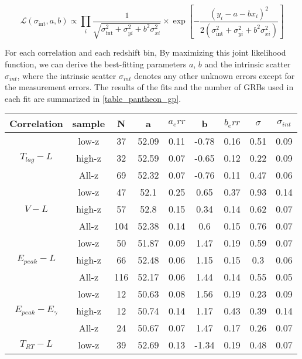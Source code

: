 $$
\mathcal{L}\left(\sigma_{\mathrm{int}}, a, b\right) \propto \prod_{i} \frac{1}{\sqrt{\sigma_{\mathrm{int}}^{2}+\sigma_{y i}^{2}+b^{2} \sigma_{x i}^{2}}} \times \exp \left[-\frac{\left(y_{i}-a-b x_{i}\right)^{2}}{2\left(\sigma_{\mathrm{int}}^{2}+\sigma_{y i}^{2}+b^{2} \sigma_{x i}^{2}\right)}\right]
$$


For each correlation and each redshift bin, By maximizing this joint likelihood function, we can derive the best-fitting parameters $a$, $b$ and the intrinsic scatter $\sigma_{int}$, where the intrinsic scatter $\sigma_{int}$ denotes any other unknown errors except for the measurement errors. The results of the fits and the number of GRBs used in each fit are summarized in \eqref{table_pantheon_gp}.




\begin{table}
\centering
\begin{tabular}{|c|c|c|c|c|c|c|c|c|}
\hline
Correlation & sample & N & a & $a_err$ & b & $b_err$ & $\sigma$ & $\sigma_{int}$\\
\hline
\multirow{3}{*}{$T_{lag}-L$} & low-z & 37 & 52.09 & 0.11 & -0.78 & 0.16 & 0.51 & 0.09\\
\cline{2-9}
 & high-z & 32 & 52.59 & 0.07 & -0.65 & 0.12 & 0.22 & 0.09\\
\cline{2-9}
 & All-z & 69 & 52.32 & 0.07 & -0.76 & 0.11 & 0.47 & 0.06\\
\hline
\multirow{3}{*}{$V-L$} & low-z & 47 & 52.1 & 0.25 & 0.65 & 0.37 & 0.93 & 0.14\\
\cline{2-9}
 & high-z & 57 & 52.8 & 0.15 & 0.34 & 0.14 & 0.62 & 0.07\\
\cline{2-9}
 & All-z & 104 & 52.38 & 0.14 & 0.6 & 0.15 & 0.76 & 0.07\\
\hline
\multirow{3}{*}{$E_{peak}-L$} & low-z & 50 & 51.87 & 0.09 & 1.47 & 0.19 & 0.59 & 0.07\\
\cline{2-9}
 & high-z & 66 & 52.48 & 0.06 & 1.15 & 0.15 & 0.3 & 0.06\\
\cline{2-9}
 & All-z & 116 & 52.17 & 0.06 & 1.44 & 0.14 & 0.55 & 0.05\\
\hline
\multirow{3}{*}{$E_{peak}-E_{\gamma}$} & low-z & 12 & 50.63 & 0.08 & 1.56 & 0.19 & 0.23 & 0.09\\
\cline{2-9}
 & high-z & 12 & 50.74 & 0.14 & 1.17 & 0.43 & 0.39 & 0.14\\
\cline{2-9}
 & All-z & 24 & 50.67 & 0.07 & 1.47 & 0.17 & 0.26 & 0.07\\
\hline
\multirow{3}{*}{$T_{RT}-L$} & low-z & 39 & 52.69 & 0.13 & -1.34 & 0.19 & 0.48 & 0.07\\

\end{tabular}
\end{table}
